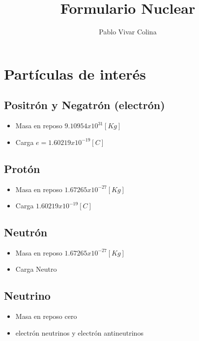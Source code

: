 \documentclass[]{article}
\title{Formulario Nuclear}
\author{Pablo Vivar Colina}
\begin{document}
	

\maketitle



\section{Partículas de interés}

\subsection{Positrón y Negatrón (electrón)}

\begin{itemize}
	\item Masa en reposo $9.10954x10^{31}[Kg]$
	\item Carga $e=1.60219x10^{-19}[C]$ 
\end{itemize}

\subsection{Protón}

\begin{itemize}
	\item Masa en reposo $1.67265x10^{-27}[Kg]$
	\item Carga $1.60219x10^{-19}[C]$
\end{itemize}

\subsection{Neutrón}

\begin{itemize}
	\item Masa en reposo $1.67265x10^{-27}[Kg]$
	\item Carga Neutro
\end{itemize}

\subsection{Neutrino}

\begin{itemize}
	\item Masa en reposo cero
	\item electrón neutrinos y electrón antineutrinos
\end{itemize}
\end{document}
